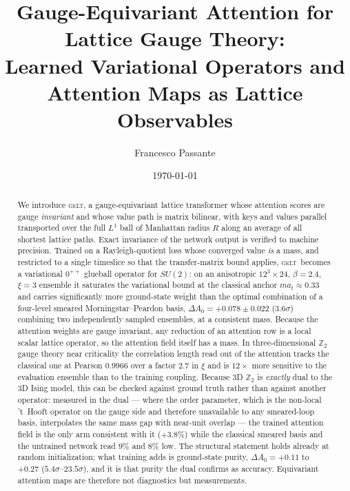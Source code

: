 \documentclass[aps,prl,reprint,superscriptaddress,nofootinbib]{revtex4-2}
\newcommand{\at}{a_t}
\newcommand{\Zt}{\mathbb{Z}_2}
\newcommand{\GELT}{\textsc{gelt}}
\begin{document}
\title{Gauge-Equivariant Attention for Lattice Gauge Theory:\\
Learned Variational Operators and Attention Maps as Lattice Observables}

\author{Francesco Passante}

\date{\today}

\begin{abstract}
We introduce \GELT, a gauge-equivariant lattice transformer whose attention
scores are gauge \emph{invariant} and whose value path is matrix bilinear, with
keys and values parallel transported over the full $L^1$ ball of Manhattan
radius $R$ along an average of all shortest lattice paths. Exact invariance of
the network output is verified to machine precision. Trained on a
Rayleigh-quotient loss whose converged value \emph{is} a mass, and restricted
to a single timeslice so that the transfer-matrix bound applies, \GELT\ becomes
a variational $0^{++}$ glueball operator for $SU(2)$: on an anisotropic
$12^3\times24$, $\beta=2.4$, $\xi=3$ ensemble it saturates the variational
bound at the classical anchor $m\at\approx0.33$ and carries significantly more
ground-state weight than the optimal combination of a four-level smeared
Morningstar--Peardon basis, $\Delta A_0=+0.078\pm0.022$ ($3.6\sigma$) combining
two independently sampled ensembles, at a consistent mass. Because the
attention weights are gauge invariant, any reduction of an attention row is a
local scalar lattice operator, so the attention field itself has a mass. In
three-dimensional $\Zt$ gauge theory near criticality the correlation length
read out of the attention tracks the classical one at Pearson $0.9966$ over a
factor $2.7$ in $\xi$ and is $12\times$ more sensitive to the evaluation
ensemble than to the training coupling. Because 3D $\Zt$ is \emph{exactly} dual
to the 3D Ising model, this can be checked against ground truth rather than
against another operator: measured in the dual --- where the order parameter,
which is the non-local 't~Hooft operator on the gauge side and therefore
unavailable to any smeared-loop basis, interpolates the same mass gap with
near-unit overlap --- the trained attention field is the only arm consistent with it
($+3.8\%$) while the classical smeared basis and the untrained network read
$9\%$ and $8\%$ low. The structural statement holds already at random initialization; what
training adds is ground-state purity, $\Delta A_0=+0.11$ to $+0.27$
($5.4\sigma$--$23.5\sigma$), and it is that purity the dual confirms as
accuracy. Equivariant attention maps are therefore not diagnostics but
measurements.
\end{abstract}
\end{document}

